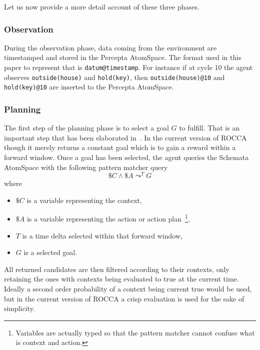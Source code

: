 \documentclass[runningheads]{llncs}
\newcommand{\lpreimp}[1]{\leadsto^{#1}}
\begin{document}
Let us now provide a more detail account of these three phases.

\subsubsection{Observation}
During the observation phase, data coming from the environment are
timestamped and stored in the Percepta AtomSpace.  The format used in
this paper to represent that is \texttt{datum@timestamp}.  For
instance if at cycle 10 the agent observes
\texttt{outside(house)} and
\texttt{hold(key)}, then \texttt{outside(house)@10} and
\texttt{hold(key)@10}
are inserted to the Percepta AtomSpace.

\subsubsection{Planning}

The first step of the planning phase is to select a goal $G$ to
fulfill.  That is an important step that has been elaborated
in~\cite{Goertzel2014EGI1, Hahm2021}.  In the current version of ROCCA
though it merely returns a constant goal which is to gain a reward
within a forward window.  Once a goal has been selected, the agent
queries the Schemata AtomSpace with the following pattern matcher
query
$$\$C \land \$A \lpreimp{T} G$$
where
\begin{itemize}
\item $\$C$ is a variable representing the context,
\item $\$A$ is a variable representing the action or action
  plan~\footnote{Variables are actually typed so that the pattern
    matcher cannot confuse what is context and action.},
\item $T$ is a time delta selected within that forward window,
\item $G$ is a selected goal.
\end{itemize}
All returned candidates are then filtered according to their contexts,
only retaining the ones with contexts being evaluated to true at the
current time.  Ideally a second order probability of a context being
current true would be used, but in the current version of ROCCA a
crisp evaluation is used for the sake of simplicity.
\end{document}
